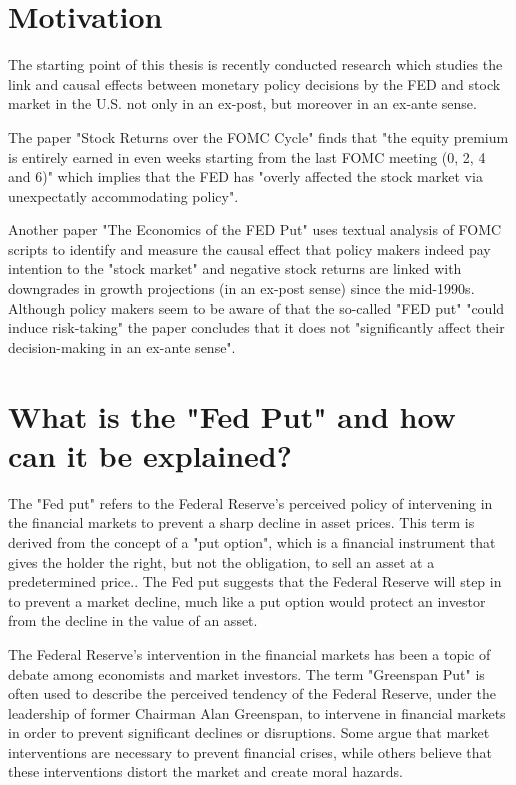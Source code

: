 
\chapter{Motivation}


The starting point of this thesis is recently conducted research which studies the link and causal effects between monetary policy decisions by the FED and stock market in the U.S.  not only in an ex-post,  but moreover in an ex-ante sense.

The paper "Stock Returns over the FOMC Cycle" \parencite{Cie19} finds that "the equity premium is entirely earned in even weeks starting from the last FOMC meeting (0,  2,  4 and 6)" which implies that the FED has "overly affected the stock market via unexpectatly accommodating policy". 

Another paper "The Economics of the FED Put"  \parencite{Cie21} uses textual analysis of FOMC scripts to identify and measure the causal effect that policy makers indeed pay intention to the "stock market" and negative stock returns are linked with downgrades in growth projections (in an ex-post sense) since the mid-1990s.  
Although policy makers seem to be aware of that the so-called "FED put" "could induce risk-taking" the paper concludes that it does not "significantly affect their decision-making in an ex-ante sense".


\chapter{What is the "Fed Put" and how can it be explained?}


The "Fed put" refers to the Federal Reserve's perceived policy of intervening in the financial markets to prevent a sharp decline in asset prices.  \parencite{WSJ7}
This term is derived from the concept of a "put option",  which is a financial instrument that gives the holder the right, but not the obligation,  to sell an asset at a predetermined price..
The Fed put suggests that the Federal Reserve will step in to prevent a market decline,  much like a put option would protect an investor from the decline in the value of an asset. 

The Federal Reserve's intervention in the financial markets has been a topic of debate among economists and market investors. 
The term "Greenspan Put" is often used to describe the perceived tendency of the Federal Reserve,  under the leadership of former Chairman Alan Greenspan,  to intervene in financial markets in order to prevent significant declines or disruptions. 
Some argue that market interventions are necessary to prevent financial crises,  while others believe that these interventions distort the market and create moral hazards.  \parencite{Cie21}

